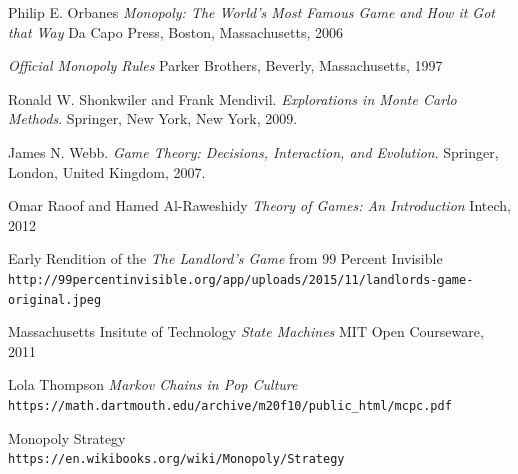 \documentclass{article}
\begin{document}
\begin{thebibliography}{10}

Philip E. Orbanes
\textit{Monopoly: The World's Most Famous Game and How it Got that Way}
Da Capo Press, Boston, Massachusetts, 2006

\textit{Official Monopoly Rules}
Parker Brothers, Beverly, Massachusetts, 1997

Ronald W. Shonkwiler and Frank Mendivil. 
\textit{Explorations in Monte Carlo Methods}. 
Springer, New York, New York, 2009.
 
James N. Webb. 
\textit{Game Theory: Decisions, Interaction, and Evolution}. 
Springer, London, United Kingdom, 2007.

Omar Raoof and Hamed Al-Raweshidy
\textit{Theory  of Games: An Introduction}
Intech, 2012

Early Rendition of the \textit{The Landlord's Game} from 99 Percent Invisible
\\\texttt{http://99percentinvisible.org/app/uploads/2015/11/landlords-game-original.jpeg}

Massachusetts Insitute of Technology
\textit{State Machines}
MIT Open Courseware, 2011

Lola Thompson
\textit{Markov Chains in Pop Culture}
\\\texttt{https://math.dartmouth.edu/archive/m20f10/public_html/mcpc.pdf}

Monopoly Strategy
\\\texttt{https://en.wikibooks.org/wiki/Monopoly/Strategy}

\end{thebibliography}
\end{document}
